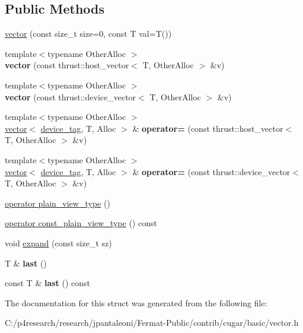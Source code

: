 \subsection*{Public Methods}
\begin{DoxyCompactItemize}
\item 
\hyperlink{group___basic_ga7954a5910e324f03b69b16b0fc0475fa}{vector} (const size\+\_\+t size=0, const T val=T())
\item 
{\footnotesize template$<$typename Other\+Alloc $>$ }\\{\bfseries vector} (const thrust\+::host\+\_\+vector$<$ T, Other\+Alloc $>$ \&v)
\item 
{\footnotesize template$<$typename Other\+Alloc $>$ }\\{\bfseries vector} (const thrust\+::device\+\_\+vector$<$ T, Other\+Alloc $>$ \&v)
\item 
{\footnotesize template$<$typename Other\+Alloc $>$ }\\\hyperlink{structcugar_1_1vector}{vector}$<$ \hyperlink{structcugar_1_1device__tag}{device\+\_\+tag}, T, Alloc $>$ \& {\bfseries operator=} (const thrust\+::host\+\_\+vector$<$ T, Other\+Alloc $>$ \&v)
\item 
{\footnotesize template$<$typename Other\+Alloc $>$ }\\\hyperlink{structcugar_1_1vector}{vector}$<$ \hyperlink{structcugar_1_1device__tag}{device\+\_\+tag}, T, Alloc $>$ \& {\bfseries operator=} (const thrust\+::device\+\_\+vector$<$ T, Other\+Alloc $>$ \&v)
\item 
\hyperlink{group___basic_ga5cdeb00ca2a3ec211fe5ceccbc9b0a20}{operator plain\+\_\+view\+\_\+type} ()
\item 
\hyperlink{group___basic_gaeb5b6b16b7efd8be40fe5c410c95b53e}{operator const\+\_\+plain\+\_\+view\+\_\+type} () const
\item 
void \hyperlink{group___basic_ga872aa5811aafdfdae83d56c76378bf53}{expand} (const size\+\_\+t sz)
\item 
T \& {\bfseries last} ()
\item 
const T \& {\bfseries last} () const
\end{DoxyCompactItemize}


The documentation for this struct was generated from the following file\+:\begin{DoxyCompactItemize}
\item 
C\+:/p4research/research/jpantaleoni/\+Fermat-\/\+Public/contrib/cugar/basic/vector.\+h\end{DoxyCompactItemize}
